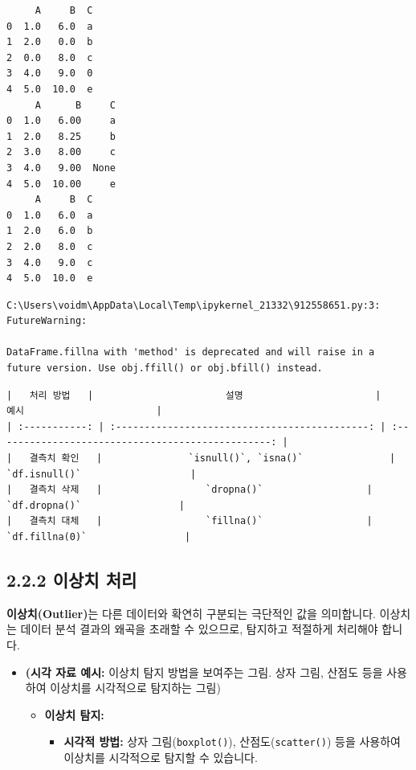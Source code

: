 \documentclass[
  letterpaper,
]{book}
\providecommand{\tightlist}{%
  \setlength{\itemsep}{0pt}\setlength{\parskip}{0pt}}
\begin{document}
\begin{verbatim}
     A     B  C
0  1.0   6.0  a
1  2.0   0.0  b
2  0.0   8.0  c
3  4.0   9.0  0
4  5.0  10.0  e
     A      B     C
0  1.0   6.00     a
1  2.0   8.25     b
2  3.0   8.00     c
3  4.0   9.00  None
4  5.0  10.00     e
     A     B  C
0  1.0   6.0  a
1  2.0   6.0  b
2  2.0   8.0  c
3  4.0   9.0  c
4  5.0  10.0  e
\end{verbatim}

\begin{verbatim}
C:\Users\voidm\AppData\Local\Temp\ipykernel_21332\912558651.py:3: FutureWarning:

DataFrame.fillna with 'method' is deprecated and will raise in a future version. Use obj.ffill() or obj.bfill() instead.
\end{verbatim}

\begin{verbatim}
|   처리 방법   |                       설명                       |                       예시                       |
| :-----------: | :--------------------------------------------: | :------------------------------------------------: |
|   결측치 확인   |               `isnull()`, `isna()`               |                   `df.isnull()`                   |
|   결측치 삭제   |                  `dropna()`                  |                 `df.dropna()`                 |
|   결측치 대체   |                  `fillna()`                  |                 `df.fillna(0)`                 |
\end{verbatim}

\subsection{2.2.2 이상치 처리}\label{uxc774uxc0c1uxce58-uxcc98uxb9ac}

\textbf{이상치(Outlier)}는 다른 데이터와 확연히 구분되는 극단적인 값을
의미합니다. 이상치는 데이터 분석 결과의 왜곡을 초래할 수 있으므로,
탐지하고 적절하게 처리해야 합니다.

\begin{itemize}
\item
  \textbf{(시각 자료 예시:} 이상치 탐지 방법을 보여주는 그림. 상자 그림,
  산점도 등을 사용하여 이상치를 시각적으로 탐지하는 그림)

  \begin{itemize}
  \tightlist
  \item
    \textbf{이상치 탐지:}

    \begin{itemize}
    \tightlist
    \item
      \textbf{시각적 방법:} 상자 그림(\texttt{boxplot()}),
      산점도(\texttt{scatter()}) 등을 사용하여 이상치를 시각적으로
      탐지할 수 있습니다.
    \end{itemize}
  \end{itemize}
\end{itemize}
\end{document}
